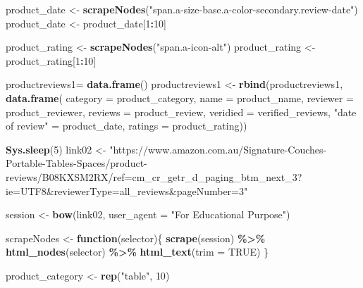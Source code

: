 \documentclass[
]{article}
\newenvironment{Shaded}{\begin{snugshade}}{\end{snugshade}}
\newcommand{\AttributeTok}[1]{\textcolor[rgb]{0.13,0.29,0.53}{#1}}
\newcommand{\ConstantTok}[1]{\textcolor[rgb]{0.56,0.35,0.01}{#1}}
\newcommand{\ControlFlowTok}[1]{\textcolor[rgb]{0.13,0.29,0.53}{\textbf{#1}}}
\newcommand{\DecValTok}[1]{\textcolor[rgb]{0.00,0.00,0.81}{#1}}
\newcommand{\FunctionTok}[1]{\textcolor[rgb]{0.13,0.29,0.53}{\textbf{#1}}}
\newcommand{\NormalTok}[1]{#1}
\newcommand{\OtherTok}[1]{\textcolor[rgb]{0.56,0.35,0.01}{#1}}
\newcommand{\SpecialCharTok}[1]{\textcolor[rgb]{0.81,0.36,0.00}{\textbf{#1}}}
\newcommand{\StringTok}[1]{\textcolor[rgb]{0.31,0.60,0.02}{#1}}
\begin{document}
\begin{Shaded}
\begin{Highlighting}[]
\NormalTok{  product\_date }\OtherTok{\textless{}{-}} \FunctionTok{scrapeNodes}\NormalTok{(}\StringTok{"span.a{-}size{-}base.a{-}color{-}secondary.review{-}date"}\NormalTok{)}
\NormalTok{  product\_date }\OtherTok{\textless{}{-}}\NormalTok{ product\_date[}\DecValTok{1}\SpecialCharTok{:}\DecValTok{10}\NormalTok{]}
  
\NormalTok{  product\_rating }\OtherTok{\textless{}{-}} \FunctionTok{scrapeNodes}\NormalTok{(}\StringTok{"span.a{-}icon{-}alt"}\NormalTok{)}
\NormalTok{  product\_rating }\OtherTok{\textless{}{-}}\NormalTok{ product\_rating[}\DecValTok{1}\SpecialCharTok{:}\DecValTok{10}\NormalTok{]}
  
\NormalTok{  productreviews1}\OtherTok{=} \FunctionTok{data.frame}\NormalTok{()}
\NormalTok{  productreviews1 }\OtherTok{\textless{}{-}} \FunctionTok{rbind}\NormalTok{(productreviews1, }\FunctionTok{data.frame}\NormalTok{(}
                      \AttributeTok{category =}\NormalTok{ product\_category,}
                      \AttributeTok{name =}\NormalTok{ product\_name,}
                      \AttributeTok{reviewer =}\NormalTok{ product\_reviewer,}
                      \AttributeTok{reviews =}\NormalTok{ product\_review,}
                      \AttributeTok{veridied =}\NormalTok{ verified\_reviews,}
                      \StringTok{"date of review"} \OtherTok{=}\NormalTok{ product\_date,}
                      \AttributeTok{ratings =}\NormalTok{ product\_rating))}

  
 \FunctionTok{Sys.sleep}\NormalTok{(}\DecValTok{5}\NormalTok{)}
\NormalTok{link02 }\OtherTok{\textless{}{-}} \StringTok{"https://www.amazon.com.au/Signature{-}Couches{-}Portable{-}Tables{-}Spaces/product{-}reviews/B08KXSM2RX/ref=cm\_cr\_getr\_d\_paging\_btm\_next\_3?ie=UTF8\&reviewerType=all\_reviews\&pageNumber=3"}


\NormalTok{  session }\OtherTok{\textless{}{-}} \FunctionTok{bow}\NormalTok{(link02,}
               \AttributeTok{user\_agent =} \StringTok{"For Educational Purpose"}\NormalTok{)}

\NormalTok{  scrapeNodes }\OtherTok{\textless{}{-}} \ControlFlowTok{function}\NormalTok{(selector)\{}
    \FunctionTok{scrape}\NormalTok{(session) }\SpecialCharTok{\%\textgreater{}\%}
      \FunctionTok{html\_nodes}\NormalTok{(selector) }\SpecialCharTok{\%\textgreater{}\%}
      \FunctionTok{html\_text}\NormalTok{(}\AttributeTok{trim =} \ConstantTok{TRUE}\NormalTok{)}
\NormalTok{  \}}

\NormalTok{  product\_category }\OtherTok{\textless{}{-}} \FunctionTok{rep}\NormalTok{(}\StringTok{"table"}\NormalTok{, }\DecValTok{10}\NormalTok{)}


\end{Highlighting}
\end{Shaded}
\end{document}
